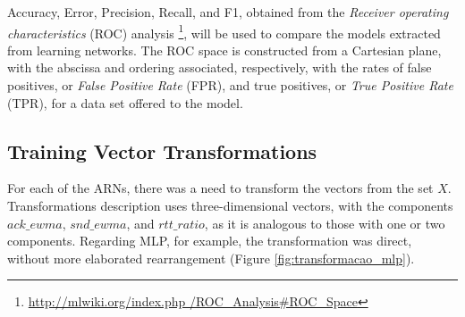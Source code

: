 \documentclass[a4paper,fleqn]{cas-sc}
\begin{document}
Accuracy, Error, Precision, Recall, and F1, obtained from the \textit{Receiver operating characteristics} (ROC) analysis \footnote{\url{http://mlwiki.org/index.php /ROC_Analysis\#ROC_Space}}, will be used to compare the models extracted from learning networks. The ROC space is constructed from a Cartesian plane, with the abscissa and ordering associated, respectively, with the rates of false positives, or \textit{False Positive Rate} (FPR), and true positives, or \textit {True Positive Rate} (TPR), for a data set offered to the model.

\subsection{Training Vector Transformations}\label{sec:espec_transf_modelos}

For each of the ARNs, there was a need to transform the vectors from the set $X$. Transformations description uses three-dimensional vectors, with the components $ack\_ewma$, $snd\_ewma$, and $rtt\_ratio$, as it is analogous to those with one or two components. Regarding MLP, for example, the transformation was direct, without more elaborated rearrangement (Figure \ref{fig:transformacao_mlp}).
\end{document}
